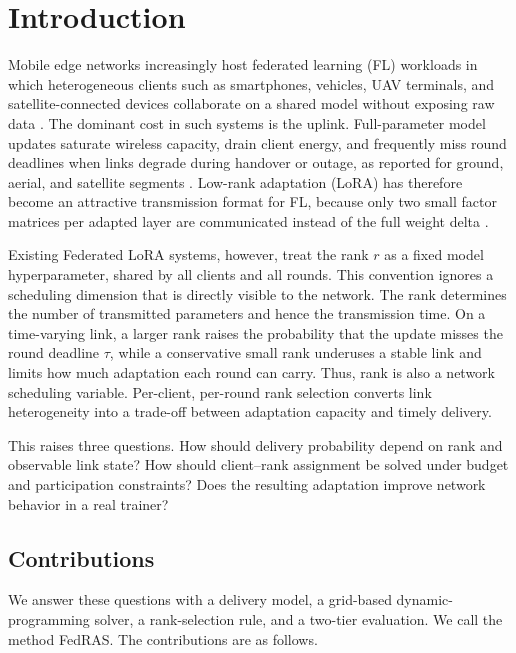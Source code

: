 \documentclass[preprint,12pt]{elsarticle}
\begin{document}
\section{Introduction}
\label{sec:intro}

Mobile edge networks increasingly host federated learning (FL) workloads in which heterogeneous clients such as smartphones, vehicles, UAV terminals, and satellite-connected devices collaborate on a shared model without exposing raw data \cite{mcmahan2017fedavg,kairouz2021advances,liu2018sagin,mahboob2024ntn}. The dominant cost in such systems is the uplink. Full-parameter model updates saturate wireless capacity, drain client energy, and frequently miss round deadlines when links degrade during handover or outage, as reported for ground, aerial, and satellite segments \cite{razmi2022ground,tang2023flsagin,qin2024dfrl,ribero2023intermittent}. Low-rank adaptation (LoRA) has therefore become an attractive transmission format for FL, because only two small factor matrices per adapted layer are communicated instead of the full weight delta \cite{hu2022lora,babakniya2023slora,zhang2024fedit}.

Existing Federated LoRA systems, however, treat the rank $r$ as a fixed model hyperparameter, shared by all clients and all rounds. This convention ignores a scheduling dimension that is directly visible to the network. The rank determines the number of transmitted parameters and hence the transmission time. On a time-varying link, a larger rank raises the probability that the update misses the round deadline $\tau$, while a conservative small rank underuses a stable link and limits how much adaptation each round can carry. Thus, rank is also a network scheduling variable. Per-client, per-round rank selection converts link heterogeneity into a trade-off between adaptation capacity and timely delivery.

This raises three questions. How should delivery probability depend on rank and observable link state? How should client--rank assignment be solved under budget and participation constraints? Does the resulting adaptation improve network behavior in a real trainer?

\subsection{Contributions}
We answer these questions with a delivery model, a grid-based dynamic-programming solver, a rank-selection rule, and a two-tier evaluation. We call the method FedRAS. The contributions are as follows.
\end{document}
